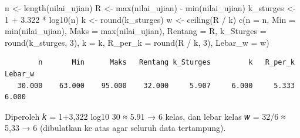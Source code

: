 \documentclass[
  indonesian,
  letterpaper,
]{book}
\newenvironment{Shaded}{\begin{snugshade}}{\end{snugshade}}
\newcommand{\AttributeTok}[1]{\textcolor[rgb]{0.40,0.45,0.13}{#1}}
\newcommand{\DecValTok}[1]{\textcolor[rgb]{0.68,0.00,0.00}{#1}}
\newcommand{\FloatTok}[1]{\textcolor[rgb]{0.68,0.00,0.00}{#1}}
\newcommand{\FunctionTok}[1]{\textcolor[rgb]{0.28,0.35,0.67}{#1}}
\newcommand{\NormalTok}[1]{\textcolor[rgb]{0.00,0.23,0.31}{#1}}
\newcommand{\OtherTok}[1]{\textcolor[rgb]{0.00,0.23,0.31}{#1}}
\newcommand{\SpecialCharTok}[1]{\textcolor[rgb]{0.37,0.37,0.37}{#1}}
\begin{document}
\begin{Shaded}
\begin{Highlighting}[]
\NormalTok{n }\OtherTok{\textless{}{-}} \FunctionTok{length}\NormalTok{(nilai\_ujian)}
\NormalTok{R }\OtherTok{\textless{}{-}} \FunctionTok{max}\NormalTok{(nilai\_ujian) }\SpecialCharTok{{-}} \FunctionTok{min}\NormalTok{(nilai\_ujian)}
\NormalTok{k\_sturges }\OtherTok{\textless{}{-}} \DecValTok{1} \SpecialCharTok{+} \FloatTok{3.322} \SpecialCharTok{*} \FunctionTok{log10}\NormalTok{(n)}
\NormalTok{k }\OtherTok{\textless{}{-}} \FunctionTok{round}\NormalTok{(k\_sturges)}
\NormalTok{w }\OtherTok{\textless{}{-}} \FunctionTok{ceiling}\NormalTok{(R }\SpecialCharTok{/}\NormalTok{ k)}
\FunctionTok{c}\NormalTok{(}\AttributeTok{n =}\NormalTok{ n, }\AttributeTok{Min =} \FunctionTok{min}\NormalTok{(nilai\_ujian), }\AttributeTok{Maks =} \FunctionTok{max}\NormalTok{(nilai\_ujian), }\AttributeTok{Rentang =}\NormalTok{ R,}
\AttributeTok{k\_Sturges =} \FunctionTok{round}\NormalTok{(k\_sturges, }\DecValTok{3}\NormalTok{), }\AttributeTok{k =}\NormalTok{ k, }\AttributeTok{R\_per\_k =} \FunctionTok{round}\NormalTok{(R }\SpecialCharTok{/}\NormalTok{ k, }\DecValTok{3}\NormalTok{), }\AttributeTok{Lebar\_w =}\NormalTok{ w)}
\end{Highlighting}
\end{Shaded}

\begin{verbatim}
        n       Min      Maks   Rentang k_Sturges         k   R_per_k   Lebar_w 
   30.000    63.000    95.000    32.000     5.907     6.000     5.333     6.000 
\end{verbatim}

Diperoleh 𝑘 = 1+3,322 log10 30 ≈ 5.91 → 6 kelas, dan lebar kelas 𝑤 =
32/6 ≈ 5,33 → 6 (dibulatkan ke atas agar seluruh data tertampung).
\end{document}
